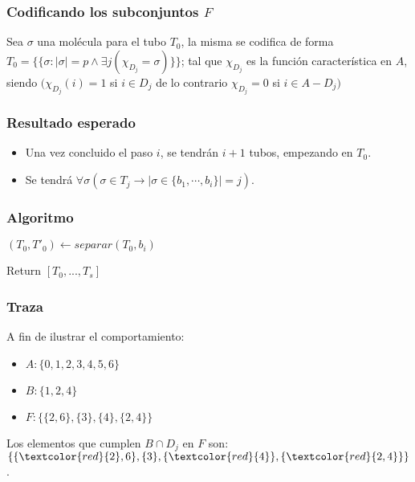 \documentclass[12pt]{beamer}
\begin{document}
 \begin{frame}
     \frametitle{Codificando los subconjuntos $F$}
     Sea $\sigma$ una molécula  para el tubo $T_0$, la misma se codifica de forma $T_0=\{\{\sigma:|\sigma|=p \land \exists j(\chi_{D_j}=\sigma)\}\}$; tal que $\chi_{D_j}$ es la función característica en $A$, siendo $(\chi_{D_j}(i) = 1$ si $i \in D_j$ de lo contrario $\chi_{D_j} = 0$ si $i \in A - D_j)$
 \end{frame}
 \begin{frame}
     \frametitle{Resultado esperado}
     \begin{itemize}
         \item Una vez concluido el paso $i$, se tendrán $i +1$ tubos, empezando en $T_0$.
         \item Se tendrá $\forall\sigma(\sigma\in T_j \rightarrow|\sigma\in\{b_1,\cdots,b_i\}|=j)$.
     \end{itemize}
 \end{frame}
 \begin{frame}
    \frametitle{Algoritmo}
    \begin{algorithmic}[1]
        \State $(T_0, T'_0) \leftarrow separar(T_0, b_i)$
        
        \EndFor
        \EndFor
        \State Return $[T_0,...,T_s]$
        \EndProcedure
    \end{algorithmic}
 \end{frame}
 \begin{frame}
     \frametitle{Traza}
     A fin de ilustrar el comportamiento:
     \begin{itemize}
        \item $A: \{0, 1, 2, 3, 4, 5, 6\}$
        \item $B: \{1, 2, 4\}$
        \item $F: \{\{2, 6\}, \{3\}, \{4\}, \{2, 4\}\}$
    \end{itemize}
    Los elementos que cumplen $B\cap D_j$ en $F$ son: $\{\{\textcolor{red}{2}, 6\}, \{3\}, \{\textcolor{red}{4}\}, \{\textcolor{red}{2, 4}\}\}$.
 \end{frame}
\end{document}
